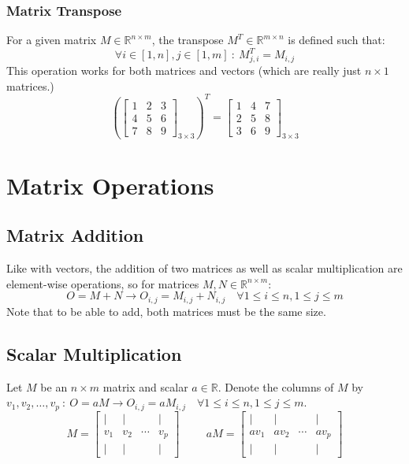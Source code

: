 \documentclass[10pt]{article}
\begin{document}
\subsubsection*{Matrix Transpose}
For a given matrix $M \in \mathbb{R}^{n \times m}$, the transpose $M^T \in \mathbb{R}^{m \times n}$ is defined such that:
\[\forall i \in [1, n], j \in [1, m] \::\: M_{j, i}^T = M_{i, j}\]
This operation works for both matrices and vectors (which are really just $n \times 1$ matrices.)
\[\left(\begin{bmatrix} 1 & 2 & 3 \\ 4 & 5 & 6 \\ 7 & 8 & 9 \end{bmatrix}_{3 \times 3}\right)^T = \begin{bmatrix} 1 & 4 & 7 \\ 2 & 5 & 8 \\ 3 & 6 & 9 \end{bmatrix}_{3 \times 3}\]

\section*{Matrix Operations}
\subsection*{Matrix Addition}
Like with vectors, the addition of two matrices as well as scalar multiplication are element-wise operations, so for matrices $M, N \in \mathbb{R}^{n \times m}$:
\[O = M + N \rightarrow O_{i, j} = M_{i, j} + N_{i, j} \quad \forall 1 \leq i \leq n, 1 \leq j \leq m\]
Note that to be able to add, both matrices must be the same size.

\subsection*{Scalar Multiplication}
Let $M$ be an $n \times m$ matrix and scalar $a \in \mathbb{R}$.  Denote the columns of $M$ by $v_1, v_2, \dots, v_p \::\: O = aM \rightarrow O_{i, j} = aM_{i, j} \quad \forall 1 \leq i \leq n, 1 \leq j \leq m$.
\[M = \begin{bmatrix} | & | & & | \\ v_1 & v_2 & \cdots & v_p \\ | & | & & | \end{bmatrix} \hspace{1cm} aM = \begin{bmatrix}| & | & & | \\ av_1 & av_2 & \cdots & av_p \\ | & | & & | \end{bmatrix}\]
\end{document}
